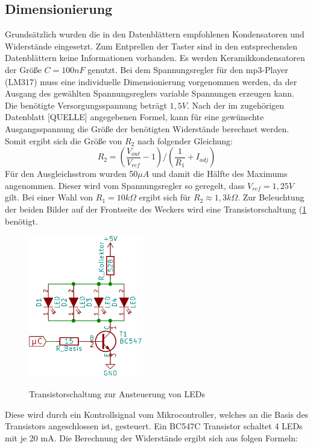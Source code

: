 \documentclass[journal, a4paper]{IEEEtran}
\begin{document}
		\subsection{Dimensionierung}
			\label{sc:Hardware:subsc:Dimensionierung}
			Grundsätzlich wurden die in den Datenblättern empfohlenen Kondensatoren und Widerstände eingesetzt. Zum Entprellen der Taster sind in den entsprechenden Datenblättern keine Informationen vorhanden. Es werden Keramikkondensatoren der Größe $C=100 nF$ genutzt. Bei dem Spannungsregler für den mp3-Player (LM317) muss eine individuelle Dimensionierung vorgenommen werden, da der Ausgang des gewählten Spannungsreglers variable Spannungen erzeugen kann.
			Die benötigte Versorgungsspannung beträgt $1,5 V$. Nach der im zugehörigen Datenblatt [QUELLE] angegebenen Formel, kann für eine gewünschte Ausgangsspannung die Größe der benötigten Widerstände berechnet werden.  Somit ergibt sich die Größe von $R_2$ nach folgender Gleichung:
			\begin{equation}
				\label{eqn:1,5VDC}
				R_2 = (\frac{V_{out}}{V_{ref}}-1) / (\frac{1}{R_1}+I_{adj})
			\end{equation}	
			Für den Ausgleichsstrom wurden 50$\mu A$ und damit die Hälfte des Maximums angenommen. Dieser wird vom Spannungsregler so geregelt, dass $V_{ref} = 1,25 V$ gilt. Bei einer Wahl von $R_1 = 10k\Omega$ ergibt sich für $R_2 \approx 1,3 k\Omega$.
			Zur Beleuchtung der beiden Bilder auf der Frontseite des Weckers wird eine Transistorschaltung (\ref{fig:Transistor} benötigt. 
			\begin{figure}
				\begin{center}
					\label{fig:Transistor}
					\includegraphics[width=5cm]{./Grafiken/Transistor.png}
					\caption{Transistorschaltung zur Ansteuerung von LEDs}
				\end{center}
			\end{figure}
			Diese wird durch ein Kontrollsignal vom Mikrocontroller, welches an die Basis des Transistors angeschlossen ist, gesteuert. Ein BC547C Transistor schaltet 4 LEDs mit je 20 mA. Die Berechnung der Widerstände ergibt sich aus folgen Formeln: 
\end{document}
